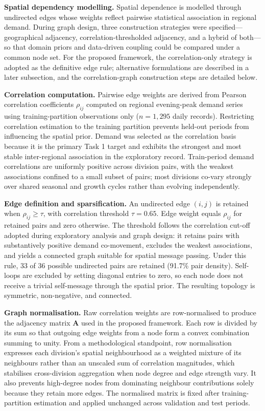 \textbf{Spatial dependency modelling.} Spatial dependence is modelled through undirected edges whose weights reflect pairwise statistical association in regional demand. During graph design, three construction strategies were specified---geographical adjacency, correlation-thresholded adjacency, and a hybrid of both---so that domain priors and data-driven coupling could be compared under a common node set. For the proposed framework, the correlation-only strategy is adopted as the definitive edge rule; alternative formulations are described in a later subsection, and the correlation-graph construction steps are detailed below.

\textbf{Correlation computation.} Pairwise edge weights are derived from Pearson correlation coefficients \(\rho_{ij}\) computed on regional evening-peak demand series using training-partition observations only (\(n = 1{,}295\) daily records). Restricting correlation estimation to the training partition prevents held-out periods from influencing the spatial prior. Demand was selected as the correlation basis because it is the primary Task 1 target and exhibits the strongest and most stable inter-regional association in the exploratory record. Train-period demand correlations are uniformly positive across division pairs, with the weakest associations confined to a small subset of pairs; most divisions co-vary strongly over shared seasonal and growth cycles rather than evolving independently.

\textbf{Edge definition and sparsification.} An undirected edge \((i, j)\) is retained when \(\rho_{ij} \geq \tau\), with correlation threshold \(\tau = 0.65\). Edge weight equals \(\rho_{ij}\) for retained pairs and zero otherwise. The threshold follows the correlation cut-off adopted during exploratory analysis and graph design: it retains pairs with substantively positive demand co-movement, excludes the weakest associations, and yields a connected graph suitable for spatial message passing. Under this rule, 33 of 36 possible undirected pairs are retained (91.7\% pair density). Self-loops are excluded by setting diagonal entries to zero, so each node does not receive a trivial self-message through the spatial prior. The resulting topology is symmetric, non-negative, and connected.

\textbf{Graph normalisation.} Raw correlation weights are row-normalised to produce the adjacency matrix \(\mathbf{A}\) used in the proposed framework. Each row is divided by its sum so that outgoing edge weights from a node form a convex combination summing to unity. From a methodological standpoint, row normalisation expresses each division's spatial neighbourhood as a weighted mixture of its neighbours rather than an unscaled sum of correlation magnitudes, which stabilises cross-division aggregation when node degree and edge strength vary. It also prevents high-degree nodes from dominating neighbour contributions solely because they retain more edges. The normalised matrix is fixed after training-partition estimation and applied unchanged across validation and test periods.

